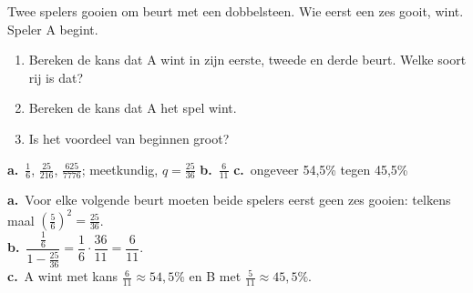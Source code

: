 \begin{oefeningen}
\begin{oefening}[2]
 Twee spelers gooien om beurt met een dobbelsteen. Wie eerst een zes gooit, wint. Speler A begint.
\begin{enumerate}
  \item Bereken de kans dat A wint in zijn eerste, tweede en derde beurt. Welke soort rij is dat?
  \item Bereken de kans dat A het spel wint.
  \item Is het voordeel van beginnen groot?
\end{enumerate}
\begin{solution}
\textbf{a.}~$\tfrac16$, $\tfrac{25}{216}$, $\tfrac{625}{7776}$; meetkundig, $q=\tfrac{25}{36}$ \quad \textbf{b.}~$\tfrac{6}{11}$ \quad \textbf{c.}~ongeveer 54,5\% tegen 45,5\%
\end{solution}
\begin{fullsolution}
\textbf{a.}~Voor elke volgende beurt moeten beide spelers eerst geen zes gooien: telkens maal $(\tfrac56)^2=\tfrac{25}{36}$.\\
\textbf{b.}~$\dfrac{\tfrac16}{1-\tfrac{25}{36}}=\dfrac16\cdot\dfrac{36}{11}=\dfrac{6}{11}$.\\
\textbf{c.}~A wint met kans $\tfrac{6}{11}\approx 54{,}5\%$ en B met $\tfrac{5}{11}\approx 45{,}5\%$.
\end{fullsolution}
\end{oefening}
\end{oefeningen}



